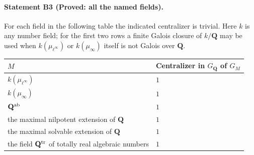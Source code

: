 \paragraph{Statement B3 (Proved: all the named fields).}\label{res:B3}
For each field in the following table the indicated centralizer is trivial.
Here $k$ is any number field; for the first two rows a finite Galois closure
of $k/\mathbf Q$ may be used when $k(\mu_{\ell^\infty})$ or
$k(\mu_\infty)$ itself is not Galois over $\mathbf Q$.
\begin{center}
\begin{tabular}{ll}
\hline
$M$ & Centralizer in $G_{\mathbf Q}$ of $G_M$\\\hline
$k(\mu_{\ell^\infty})$ & $1$\\
$k(\mu_\infty)$ & $1$\\
$\mathbf Q^{\rm ab}$ & $1$\\
the maximal nilpotent extension of $\mathbf Q$ & $1$\\
the maximal solvable extension of $\mathbf Q$ & $1$\\
the field $\mathbf Q^{\rm tr}$ of totally real algebraic numbers & $1$\\\hline
\end{tabular}
\end{center}


